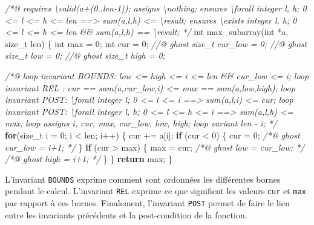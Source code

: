 \documentclass[12pt,francais,]{scrbook}
\newenvironment{Shaded}{}{}
\newcommand{\KeywordTok}[1]{\textcolor[rgb]{0.00,0.44,0.13}{\textbf{{#1}}}}
\newcommand{\DataTypeTok}[1]{\textcolor[rgb]{0.56,0.13,0.00}{{#1}}}
\newcommand{\DecValTok}[1]{\textcolor[rgb]{0.25,0.63,0.44}{{#1}}}
\newcommand{\CommentTok}[1]{\textcolor[rgb]{0.38,0.63,0.69}{\textit{{#1}}}}
\newcommand{\NormalTok}[1]{{#1}}
\begin{document}
\begin{footnotesize}\begin{Shaded}
\begin{Highlighting}[]
\CommentTok{/*@ }
\CommentTok{  requires \textbackslash{}valid(a+(0..len-1));}
\CommentTok{  assigns \textbackslash{}nothing;}
\CommentTok{  ensures \textbackslash{}forall integer l, h;  0 <= l <= h <= len ==> sum(a,l,h) <= \textbackslash{}result;}
\CommentTok{  ensures \textbackslash{}exists integer l, h;  0 <= l <= h <= len &&  sum(a,l,h) == \textbackslash{}result;}
\CommentTok{*/}
\DataTypeTok{int} \NormalTok{max_subarray(}\DataTypeTok{int} \NormalTok{*a, size_t len) \{}
  \DataTypeTok{int} \NormalTok{max = }\DecValTok{0}\NormalTok{;}
  \DataTypeTok{int} \NormalTok{cur = }\DecValTok{0}\NormalTok{;}
  \CommentTok{//@ ghost size_t cur_low = 0; }
  \CommentTok{//@ ghost size_t low = 0;}
  \CommentTok{//@ ghost size_t high = 0; }

  \CommentTok{/*@ }
\CommentTok{    loop invariant BOUNDS: low <= high <= i <= len && cur_low <= i;}
\CommentTok{    }
\CommentTok{    loop invariant REL :   cur == sum(a,cur_low,i) <= max == sum(a,low,high);}
\CommentTok{    loop invariant POST:   \textbackslash{}forall integer l;    0 <= l <= i      ==> sum(a,l,i) <= cur;}
\CommentTok{    loop invariant POST:   \textbackslash{}forall integer l, h; 0 <= l <= h <= i ==> sum(a,l,h) <= max;}
\CommentTok{   }
\CommentTok{    loop assigns i, cur, max, cur_low, low, high;}
\CommentTok{    loop variant len - i; }
\CommentTok{  */}
  \KeywordTok{for}\NormalTok{(size_t i = }\DecValTok{0}\NormalTok{; i < len; i++) \{}
    \NormalTok{cur += a[i];}
    \KeywordTok{if} \NormalTok{(cur < }\DecValTok{0}\NormalTok{) \{}
      \NormalTok{cur = }\DecValTok{0}\NormalTok{;}
      \CommentTok{/*@ ghost cur_low = i+1; */}
    \NormalTok{\}}
    \KeywordTok{if} \NormalTok{(cur > max) \{}
      \NormalTok{max = cur;}
      \CommentTok{/*@ ghost low = cur_low; */}
      \CommentTok{/*@ ghost high = i+1; */}
    \NormalTok{\}}
  \NormalTok{\}}
  \KeywordTok{return} \NormalTok{max;}
\NormalTok{\}}
\end{Highlighting}
\end{Shaded}\end{footnotesize}

L'invariant \texttt{BOUNDS} exprime comment sont ordonnées les
différentes bornes pendant le calcul. L'invariant \texttt{REL} exprime
ce que signifient les valeurs \texttt{cur} et \texttt{max} par rapport à
ces bornes. Finalement, l'invariant \texttt{POST} permet de faire le
lien entre les invariants précédents et la post-condition de la
fonction.
\end{document}
